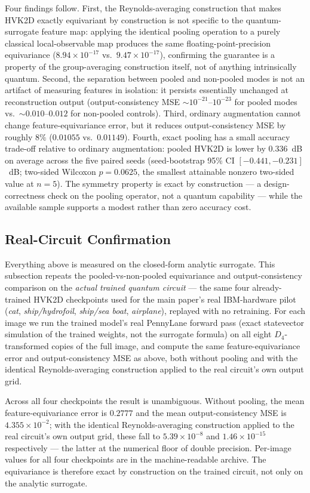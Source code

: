 \documentclass[11pt]{article}
\begin{document}
Four findings follow. First, the Reynolds-averaging construction that makes HVK2D exactly equivariant by construction is not specific to the quantum-surrogate feature map: applying the identical pooling operation to a purely classical local-observable map produces the same floating-point-precision equivariance ($8.94\times10^{-17}$ vs.\ $9.47\times10^{-17}$), confirming the guarantee is a property of the group-averaging construction itself, not of anything intrinsically quantum. Second, the separation between pooled and non-pooled modes is not an artifact of measuring features in isolation: it persists essentially unchanged at reconstruction output (output-consistency MSE $\sim10^{-21}$--$10^{-23}$ for pooled modes vs.\ $\sim0.010$--$0.012$ for non-pooled controls). Third, ordinary augmentation cannot change feature-equivariance error, but it reduces output-consistency MSE by roughly $8\%$ ($0.01055$ vs.\ $0.01149$). Fourth, exact pooling has a small accuracy trade-off relative to ordinary augmentation: pooled HVK2D is lower by $0.336$~dB on average across the five paired seeds (seed-bootstrap 95\% CI $[-0.441,-0.231]$~dB; two-sided Wilcoxon $p=0.0625$, the smallest attainable nonzero two-sided value at $n=5$). The symmetry property is exact by construction --- a design-correctness check on the pooling operator, not a quantum capability --- while the available sample supports a modest rather than zero accuracy cost.

\subsection{Real-Circuit Confirmation}
\label{sec:d4_real_circuit}
Everything above is measured on the closed-form analytic surrogate. This subsection repeats the pooled-vs-non-pooled equivariance and output-consistency comparison on the \emph{actual trained quantum circuit} --- the same four already-trained HVK2D checkpoints used for the main paper's real IBM-hardware pilot (\textit{cat}, \textit{ship/hydrofoil}, \textit{ship/sea boat}, \textit{airplane}), replayed with no retraining. For each image we run the trained model's real PennyLane forward pass (exact statevector simulation of the trained weights, not the surrogate formula) on all eight $D_4$-transformed copies of the full image, and compute the same feature-equivariance error and output-consistency MSE as above, both without pooling and with the identical Reynolds-averaging construction applied to the real circuit's own output grid.

Across all four checkpoints the result is unambiguous. Without pooling, the mean feature-equivariance error is $0.2777$ and the mean output-consistency MSE is $4.355\times10^{-2}$; with the identical Reynolds-averaging construction applied to the real circuit's own output grid, these fall to $5.39\times10^{-8}$ and $1.46\times10^{-15}$ respectively --- the latter at the numerical floor of double precision. Per-image values for all four checkpoints are in the machine-readable archive. The equivariance is therefore exact by construction on the trained circuit, not only on the analytic surrogate.
\end{document}
